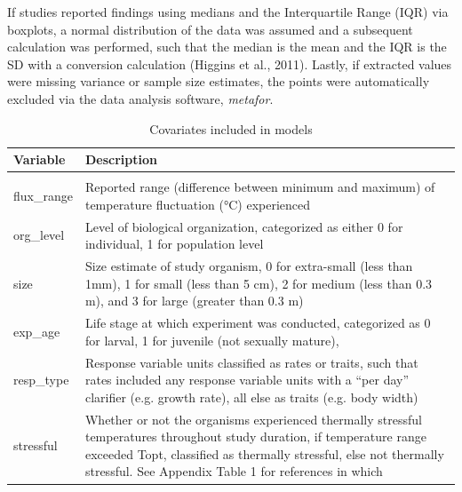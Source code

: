 \documentclass[12pt,twoside]{reedthesis}
\begin{document}
If studies reported findings using medians and the Interquartile Range (IQR) via boxplots, a normal distribution of the data was assumed and a subsequent calculation was performed, such that the median is the mean and the IQR is the SD with a conversion calculation (Higgins et al., 2011). Lastly, if extracted values were missing variance or sample size estimates, the points were automatically excluded via the data analysis software, \emph{metafor}.

\clearpage
\begin{table}[!h]

\caption{\label{tab:unnamed-chunk-9}Covariates included in models}
\centering
\begin{tabular}[t]{l>{\raggedright\arraybackslash}p{8cm}}
\toprule
\textbf{Variable} & \textbf{Description}\\
\midrule
\cellcolor{gray!6}{mean\_temp\_constant} & \cellcolor{gray!6}{Reported mean temperature (°C) in study}\\
flux\_range & Reported range (difference between minimum 
                                     and maximum) of temperature fluctuation (°C) experienced\\
org\_level & Level of biological organization, categorized
                                     as either 0 for individual, 1 for population level
\cellcolor{gray!6}{                                     responses, 2 for community level responses}\\
size & Size estimate of study organism, 0 for extra-small (less than 1mm),
                                     1 for small (less than 5 cm), 2 for medium (less than 0.3 m), and 3
                                     for large (greater than 0.3 m)\\
exp\_age & Life stage at which experiment was conducted, 
                                     categorized as 0 for larval, 1 for juvenile (not sexually mature),
\cellcolor{gray!6}{                                     and 2 for adult}\\
\addlinespace
resp\_type & Response variable units classified as rates or traits, 
                                     such that rates included any response variable units with a
                                     “per day” clarifier (e.g. growth rate), all else as traits (e.g. body
                                     width)\\
stressful & Whether or not the organisms experienced thermally stressful 
                                     temperatures throughout study duration, if temperature range 
                                     exceeded Topt, classified as thermally stressful, else not
                                     thermally stressful. See Appendix Table 1 for references in which
\cellcolor{gray!6}{                                     organisms’ thermal stress metrics were included}\\
\bottomrule
\end{tabular}
\end{table}
\clearpage
\end{document}
